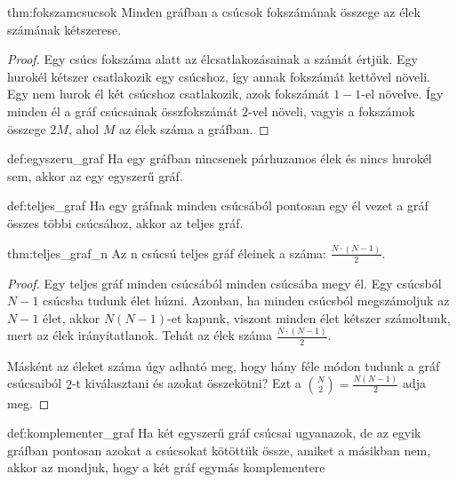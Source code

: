 \begin{theorem}{thm:fokszamcsucsok}
    Minden gráfban a csúcsok fokszámának összege az élek számának kétszerese.
\end{theorem}

\begin{proof}
    Egy csúcs fokszáma alatt az élcsatlakozásainak a számát értjük.
    Egy hurokél kétszer csatlakozik egy csúcshoz, így annak fokszámát kettővel növeli.
    Egy nem hurok él két csúcshoz csatlakozik, azok fokszámát $1-1$-el növelve.
    Így minden él a gráf csúcsainak összfokszámát $2$-vel növeli, vagyis a fokszámok összege $2M$, ahol $M$ az élek száma a gráfban.
\end{proof}

\begin{definition}{def:egyszeru_graf}
    Ha egy gráfban nincsenek párhuzamos élek és nincs hurokél sem, akkor az egy egyszerű gráf. 
\end{definition}

\begin{definition}{def:teljes_graf}
    Ha egy gráfnak minden csúcsából pontosan egy él vezet a gráf összes többi csúcsához, akkor az teljes gráf. 
\end{definition}

\begin{theorem}{thm:teljes_graf_n}
    Az n csúcsú teljes gráf éleinek a száma: $\frac{N \cdot (N-1)}{2}$.
\end{theorem}

\begin{proof}
    Egy teljes gráf minden csúcsából minden csúcsába megy él.
    Egy csúcsból $N-1$ csúcsba tudunk élet húzni.
    Azonban, ha minden csúcsból megszámoljuk az $N-1$ élet, akkor $N(N-1)$-et kapunk, viszont minden élet kétszer számoltunk, mert az élek irányítatlanok.
    Tehát az élek száma $\frac{N \cdot (N-1)}{2}$.

    Másként az éleket száma úgy adható meg, hogy hány féle módon tudunk a gráf csúcsaiból $2$-t kiválasztani és azokat összekötni?
    Ezt a ${N\choose2} =\frac{N(N-1)}{2}$ adja meg.
\end{proof}

\begin{definition}{def:komplementer_graf}
    Ha két egyszerű gráf csúcsai ugyanazok, de az egyik gráfban pontosan azokat a csúcsokat kötöttük össze, amiket a másikban nem, akkor az mondjuk, hogy a két gráf egymás komplementere
\end{definition}

